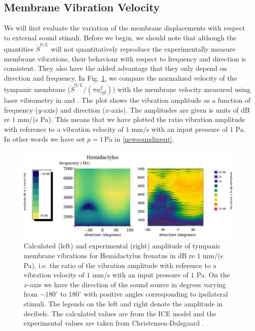 \subsection{Membrane Vibration Velocity}\label{vibvelocity}
We will first evaluate the variation of the membrane displacements with respect to external 
sound stimuli. Before we begin, we should note that although the quantities
$\dot{S}^{0/L}$ will not quantitatively reproduce the experimentally measure membrane vibrations, their behaviour with respect to
frequency and direction is consistent. They also have the added advantage that they only depend on direction and frequency. In Fig. \ref{hemidactylusvibampfull},
we compare the normalized velocity of the tympanic membrane ($\dot{S}^{0/L}/(\pi a^2_{cyl})$) with the membrane velocity measured using laser vibrometry
in \cite{dalsgaardmanley1} and \cite{dalsgaardmanley2}. The plot shows the vibration amplitude as a function of frequency ($y$-axis) and direction ($x$-axis). The amplitudes are given
is units of dB re $1$ mm/(s Pa). This means that we have plotted the ratio vibration amplitude with reference to a vibration velocity of $1$ mm/s with an input pressure of $1$ Pa.
In other words we have set $p=1\,$Pa in \eqref{newsoundinput}.
\begin{figure}[ht!]
 \centering
 \includegraphics[width=1.0\linewidth]{Diagrams/Plots/hemidactylusvibampfull.png}
 \caption[Vibration amplitude for the common house gecko]{Calculated (left) and experimental (right) amplitude of tympanic membrane vibrations for Hemidactylus frenatus
 in dB re $1$ mm/(s Pa), i.e. the ratio of the vibration amplitude with reference to a vibration velocity of $1$ mm/s with an input pressure of $1$ Pa. On the $x$-axis we have
 the direction of the sound source in degrees varying from $-180^\circ\mbox{ to }180^\circ$ with positive angles corresponding to ipsilateral stimuli. The legends on the left and
 right denote the amplitude in decibels. The calculated values are from the ICE model and the experimental values are taken from Christensen-Dalsgaard \cite{dalsgaardmanley2}.}
  \label{hemidactylusvibampfull}
\end{figure}

